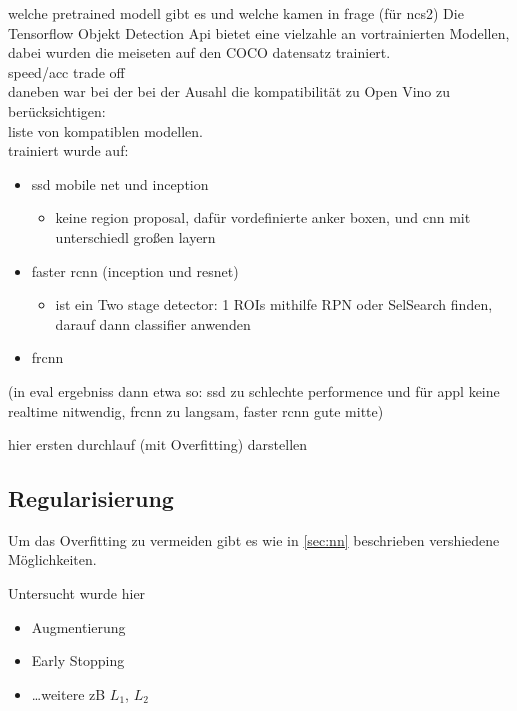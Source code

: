 welche pretrained modell gibt es und welche kamen in frage (für ncs2)
Die Tensorflow Objekt Detection Api bietet eine vielzahle an vortrainierten Modellen, 
dabei wurden die meiseten auf den COCO datensatz trainiert.\\

speed/acc trade off \\%

daneben war bei der bei der Ausahl die kompatibilität zu Open Vino zu berücksichtigen:\\
liste von kompatiblen modellen.\\

trainiert wurde auf:\\
\begin{itemize}
    \item ssd mobile net und inception
    \begin{itemize}
        \item keine region proposal, dafür vordefinierte anker boxen, und cnn mit unterschiedl großen layern
    \end{itemize}
    \item faster rcnn (inception und resnet)
    \begin{itemize}
        \item ist ein Two stage detector: 1 ROIs mithilfe RPN oder SelSearch finden, darauf dann classifier anwenden
    \end{itemize}
    \item frcnn
\end{itemize}

(in eval ergebniss dann etwa so: ssd zu schlechte 
performence und für appl keine realtime nitwendig, 
frcnn zu langsam, faster rcnn gute mitte)

hier ersten durchlauf (mit Overfitting) darstellen

\subsection{Regularisierung}

Um das Overfitting zu vermeiden gibt es wie in \ref{sec:nn} 
beschrieben vershiedene Möglichkeiten.

Untersucht wurde hier

\begin{itemize}
    \item Augmentierung
    \item Early Stopping
    \item \dots weitere zB $L_{1}$, $L_{2}$
\end{itemize}




